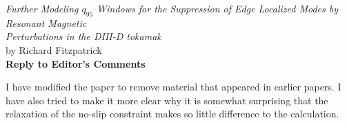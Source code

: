 \documentclass{article}[12pt]
\begin{document}
\begin{center}
{\em Further Modeling $q_{95}$ Windows for the Suppression of Edge Localized Modes by Resonant Magnetic}\\[0.5ex]
{\em Perturbations in the DIII-D tokamak}\\[1ex]
by Richard Fitzpatrick\\[1ex]
{\bf Reply to Editor's Comments}
\end{center}

I have modified the paper to remove material that appeared in earlier papers. I have also tried to make it more
clear why it is somewhat surprising that the relaxation of the no-slip constraint makes so little difference to
the calculation.
\end{document}
